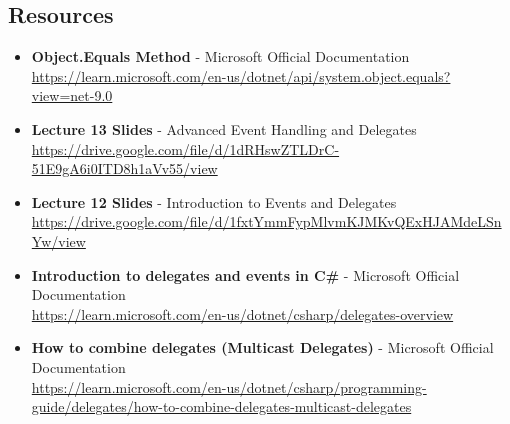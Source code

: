 % 

\subsection{Resources}

\begin{itemize}
    \item \textbf{Object.Equals Method} - Microsoft Official Documentation \\
    \href{https://learn.microsoft.com/en-us/dotnet/api/system.object.equals?view=net-9.0}{https://learn.microsoft.com/en-us/dotnet/api/system.object.equals?view=net-9.0}
    
    \item \textbf{Lecture 13 Slides} - Advanced Event Handling and Delegates \\
    \href{https://drive.google.com/file/d/1dRHswZTLDrC-51E9gA6i0ITD8h1aVv55/view}{https://drive.google.com/file/d/1dRHswZTLDrC-51E9gA6i0ITD8h1aVv55/view}
    
    \item \textbf{Lecture 12 Slides} - Introduction to Events and Delegates \\
    \href{https://drive.google.com/file/d/1fxtYmmFypMlvmKJMKvQExHJAMdeLSnYw/view}{https://drive.google.com/file/d/1fxtYmmFypMlvmKJMKvQExHJAMdeLSnYw/view}
    
    \item \textbf{Introduction to delegates and events in C\#} - Microsoft Official Documentation \\
    \href{https://learn.microsoft.com/en-us/dotnet/csharp/delegates-overview}{https://learn.microsoft.com/en-us/dotnet/csharp/delegates-overview}
    
    \item \textbf{How to combine delegates (Multicast Delegates)} - Microsoft Official Documentation \\
    \href{https://learn.microsoft.com/en-us/dotnet/csharp/programming-guide/delegates/how-to-combine-delegates-multicast-delegates}{https://learn.microsoft.com/en-us/dotnet/csharp/programming-guide/delegates/how-to-combine-delegates-multicast-delegates}
\end{itemize}
